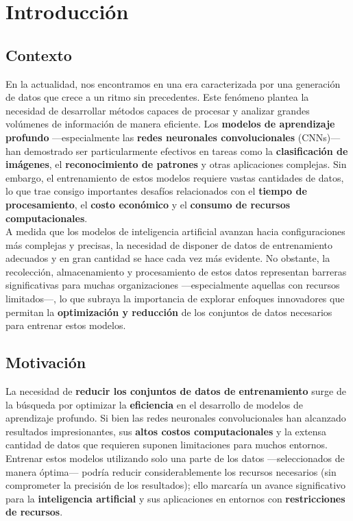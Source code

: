 \chapter{Introducción}\label{ch:introduccion}

\section{Contexto}\label{sec:contexto}
En la actualidad, nos encontramos en una era caracterizada por una generación de datos que crece a un ritmo sin
precedentes.
Este fenómeno plantea la necesidad de desarrollar métodos capaces de procesar y analizar grandes volúmenes de
información de manera eficiente.
Los \textbf{modelos de aprendizaje profundo} —especialmente las \textbf{redes neuronales convolucionales} (CNNs)— han
demostrado ser particularmente efectivos en tareas como la \textbf{clasificación de imágenes}, el
\textbf{reconocimiento de patrones} y otras aplicaciones complejas.
Sin embargo, el entrenamiento de estos modelos requiere vastas cantidades de datos, lo que trae consigo importantes
desafíos relacionados con el \textbf{tiempo de procesamiento}, el \textbf{costo económico} y el
\textbf{consumo de recursos computacionales}. \\[6pt]

A medida que los modelos de inteligencia artificial avanzan hacia configuraciones más complejas y precisas, la
necesidad de disponer de datos de entrenamiento adecuados y en gran cantidad se hace cada vez más evidente.
No obstante, la recolección, almacenamiento y procesamiento de estos datos representan barreras significativas para
muchas organizaciones —especialmente aquellas con recursos limitados—, lo que subraya la importancia de explorar
enfoques innovadores que permitan la \textbf{optimización y reducción} de los conjuntos de datos necesarios para
entrenar estos modelos. \\[6pt]

\section{Motivación}\label{sec:motivacion}
La necesidad de \textbf{reducir los conjuntos de datos de entrenamiento} surge de la búsqueda por optimizar la
\textbf{eficiencia} en el desarrollo de modelos de aprendizaje profundo.
Si bien las redes neuronales convolucionales han alcanzado resultados impresionantes, sus
\textbf{altos costos computacionales} y la extensa cantidad de datos que requieren suponen limitaciones para muchos
entornos.
Entrenar estos modelos utilizando solo una parte de los datos —seleccionados de manera óptima— podría reducir
considerablemente los recursos necesarios (sin comprometer la precisión de los resultados); ello marcaría un avance
significativo para la \textbf{inteligencia artificial} y sus aplicaciones en entornos con
\textbf{restricciones de recursos}. \\[6pt]

